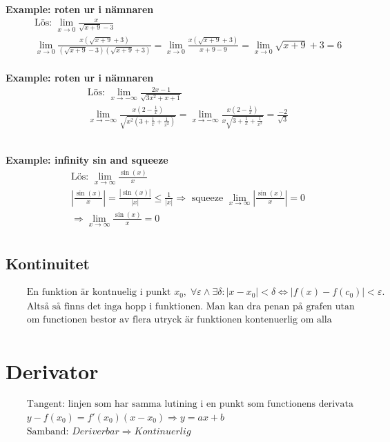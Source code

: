 \textbf{Example: roten ur i nämnaren}
\begin{align*}
  &\quad  \text{Lös: } \lim_{x\to 0} \frac{x}{\sqrt{x+9}-3}  \\
  &\quad  \lim_{x\to 0} \frac{x(\sqrt{x+9}+3)}{(\sqrt{x+9}-3)(\sqrt{x+9}+3)} =
  \lim_{x\to 0} \frac{x(\sqrt{x+9}+3)}{x+9-9} = \lim_{x\to 0} \sqrt{x+9}+3 = 6   \\
\end{align*}

\textbf{Example: roten ur i nämnaren}
\begin{align*}
  &\quad  \text{Lös: } \lim_{x\to-\infty} \frac{2x-1}{\sqrt{3x^2+x+1}}  \\
  &\quad  \lim_{x\to-\infty} \frac{x(2-\frac{1}{x})}{\sqrt{x^2(3+\frac{1}{x}+\frac{1}{x^2})}} =
  \lim_{x\to-\infty} \frac{x(2-\frac{1}{x})}{x\sqrt{3+\frac{1}{x}+\frac{1}{x^2}}} = \frac{-2}{\sqrt{3}} \\
  &\quad   \\
  &\quad   \\
\end{align*}

\textbf{Example: infinity sin and squeeze}
\begin{align*}
  &\quad  \text{Lös: } \lim_{x\to\infty}\frac{\sin(x)}{x}  \\
  &\quad  |\frac{\sin(x)}{x}| = \frac{|\sin(x)|}{|x|} \leq \frac{1}{|x|} \Rightarrow \text{ squeeze }
  \lim_{x\to\infty}|\frac{\sin(x)}{x}| = 0  \\
  &\quad  \Rightarrow \lim_{x\to\infty}\frac{\sin(x)}{x} = 0  \\
\end{align*}


\subsection{Kontinuitet}
\begin{align*}
  &\quad  \text{En funktion är kontnuelig i punkt } x_0, \; \forall \varepsilon \land \exists \delta: |x-x_0| < \delta \Leftrightarrow |f(x)-f(c_0)|<\varepsilon. \\
  &\quad  \text{Altså så finns det inga hopp i funktionen. Man kan dra penan på grafen utan att släppa} \\
  &\quad  \text{om functionen bestor av flera utryck är funktionen kontenuerlig om alla utrycken är det } \\
\end{align*}


\section{Derivator}
\begin{align*}
  &\quad  \text{Tangent: linjen som har samma lutining i en punkt som functionens derivata} \\
  &\quad  y-f(x_0)=f'(x_0)(x-x_0) \Rightarrow y=ax+b \\ %
  &\quad  \text{Samband: } Deriverbar \Rightarrow Kontinuerlig \\
\end{align*}

